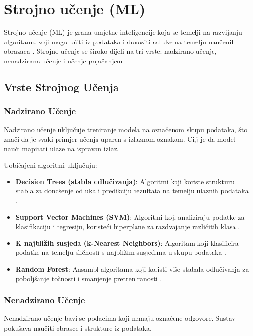 \documentclass[zavrsnirad]{fer}
\begin{document}
\section{Strojno učenje (ML)}
Strojno učenje (ML) je grana umjetne inteligencije koja se temelji na razvijanju algoritama koji mogu učiti iz podataka i donositi odluke na temelju naučenih obrazaca \cite{ml_book}. Strojno učenje se široko dijeli na tri vrste: nadzirano učenje, nenadzirano učenje i učenje pojačanjem.

\subsection{Vrste Strojnog Učenja}

\subsubsection{Nadzirano Učenje}

Nadzirano učenje uključuje treniranje modela na označenom skupu podataka, što znači da je svaki primjer učenja uparen s izlaznom oznakom. Cilj je da model nauči mapirati ulaze na ispravan izlaz.

Uobičajeni algoritmi uključuju:

\begin{itemize}
	\item \textbf{Decision Trees (stabla odlučivanja)}: Algoritmi koji koriste strukturu stabla za donošenje odluka i predikciju rezultata na temelju ulaznih podataka \cite{somvanshi2016}.
	\item \textbf{Support Vector Machines (SVM)}: Algoritmi koji analiziraju podatke za klasifikaciju i regresiju, koristeći hiperplane za razdvajanje različitih klasa \cite{somvanshi2016}.
	\item \textbf{K najbližih susjeda (k-Nearest Neighbors)}: Algoritam koji klasificira podatke na temelju sličnosti s najbližim susjedima u skupu podataka \cite{mahesh2019}.
	\item \textbf{Random Forest}: Ansambl algoritama koji koristi više stabala odlučivanja za poboljšanje točnosti i smanjenje pretreniranosti \cite{mahesh2019}.
\end{itemize}

\subsubsection{Nenadzirano Učenje}

Nenadzirano učenje bavi se podacima koji nemaju označene odgovore. Sustav pokušava naučiti obrasce i strukture iz podataka.
\end{document}
